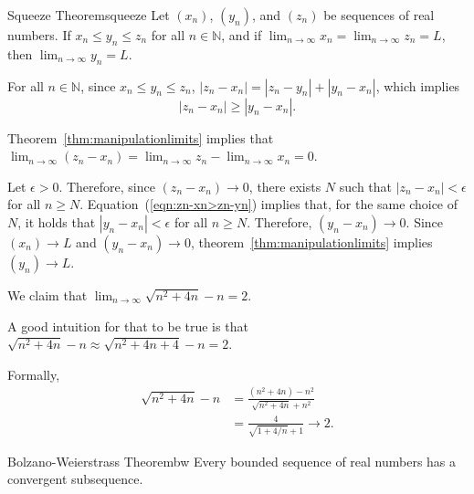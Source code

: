 
\begin{thm}{Squeeze Theorem}{squeeze}
	Let \((x_n)\), \((y_n)\), and \((z_n)\) be sequences of real numbers.
	If $x_n \le y_n \le z_n$ for all $n \in \mathbb{N}$, and if $\lim_{n\to\infty} x_n = \lim_{n\to\infty} z_n = L$, then $\lim_{n\to\infty} y_n = L$.  
\end{thm}

\begin{dem}{}{}
	For all \(n \in \mathbb{N}\), since \(x_n \leq y_n \leq z_n\), \( |z_n - x_n| = |z_n - y_n| + |y_n - x_n| \), which implies
	\begin{equation} \label{eqn:zn-xn>zn-yn}
		|z_n - x_n| \geq |y_n - x_n|.
	\end{equation}

	Theorem~\ref{thm:manipulationlimits} implies that \(\lim_{n\to\infty} (z_n - x_n) = \lim_{n\to\infty} z_n - \lim_{n\to\infty} x_n = 0\).

	Let \(\epsilon > 0\). Therefore, since \((z_n - x_n) \to 0\), there exists \(N\) such that \(|z_n - x_n| < \epsilon\) for all \(n \geq N\).
	Equation~(\ref{eqn:zn-xn>zn-yn}) implies that, for the same choice of \(N\), it holds that \(|y_n - x_n| < \epsilon\) for all \(n \geq N\). Therefore,  \((y_n - x_n) \to 0\).
	Since \((x_n) \to L\) and \((y_n - x_n) \to 0\), theorem~\ref{thm:manipulationlimits} implies \((y_n) \to L\).
\end{dem}

\begin{exmp}{}{}
	We claim that \(\lim_{n\to\infty} \sqrt{n^2 + 4n} - n = 2\).

	A good intuition for that to be true is that \(\sqrt{n^2 + 4n} - n \approx \sqrt{n^2 + 4n + 4} - n = 2\).

	Formally, \begin{align*}
		\sqrt{n^2 + 4n} - n &= \frac{(n^2 + 4n) - n^2}{\sqrt{n^2 + 4n} + n^2}\\
							&= \frac{4}{\sqrt{1 + 4/n} + 1} \to 2.
	\end{align*}
\end{exmp}

\begin{thm}{Bolzano-Weierstrass Theorem}{bw}
	Every bounded sequence of real numbers has a convergent subsequence.
\end{thm}

